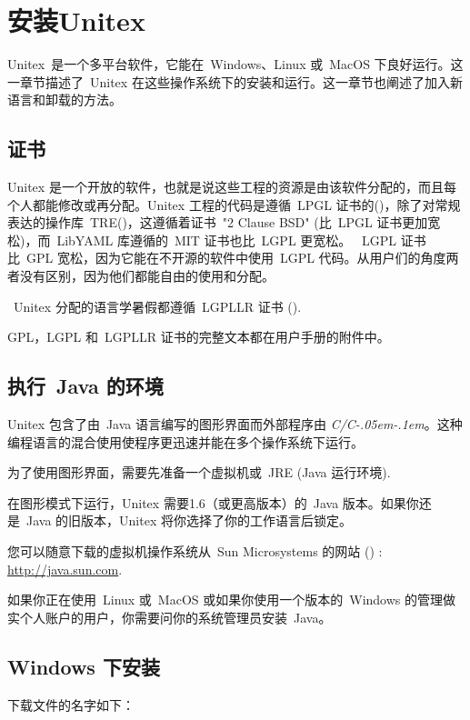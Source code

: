 \chapter{安装Unitex}
\label{chap-install}
Unitex\ 是一个多平台软件，它能在\ Windows、Linux 或\ MacOS 下良好运行。这一章节描述了\ Unitex 在这些操作系统下的安装和运行。这一章节也阐述了加入新语言和卸载的方法。

\section{证书}
\label{section-licences}
Unitex 是一个开放的软件，也就是说这些工程的资源是由该软件分配的，而且每个人都能修改或再分配。Unitex 工程的代码是遵循\ LPGL 证书的(\cite{LGPL})，除了对常规表达的操作库\ TRE(\cite{TRE})，这遵循着证书\ "2 Clause BSD" (比\ LPGL 证书更加宽松)，而\ LibYAML 库遵循的\ MIT 证书也比\ LGPL 更宽松。
\ LGPL 证书比\ GPL 宽松，因为它能在不开源的软件中使用\ LGPL 代码。从用户们的角度两者没有区别，因为他们都能自由的使用和分配。

\bigskip
{}\ Unitex 分配的语言学暑假都遵循\ LGPLLR 证书
 (\cite{LGPLLR}).

\bigskip
\noindent GPL，LGPL 和\ LGPLLR 证书的完整文本都在用户手册的附件中。

\section{执行\ Java 的环境}
Unitex 包含了由\ Java 语言编写的图形界面而外部程序由 \textit{C/C\kern-.05em\raisebox{.5ex}{++}\kern-.1em}。这种编程语言的混合使用使程序更迅速并能在多个操作系统下运行。


\bigskip
\noindent 为了使用图形界面，需要先准备一个虚拟机或\ 
JRE (Java 运行环境).

\bigskip
\noindent 在图形模式下运行，Unitex 需要1.6（或更高版本）的\ Java 版本。如果你还是\ Java 的旧版本，Unitex 将你选择了你的工作语言后锁定。

\bigskip
\noindent 您可以随意下载的虚拟机操作系统从\ Sun Microsystems 的网站 (\cite{site-java}) : 
\url{http://java.sun.com}.

\bigskip
\noindent 如果你正在使用\ Linux 或\ MacOS 或如果你使用一个版本的\ Windows 的管理做实个人账户的用户，你需要问你的系统管理员安装\ Java。



\section{Windows 下安装}
下载文件的名字如下：
\begin{flushleft}
{\tt \UnitexPackageWin{}}
{\tt \UnitexPackageWinSF{}}
\end{flushleft}




